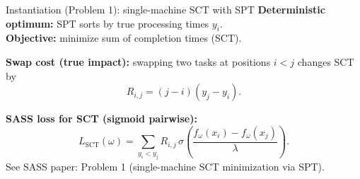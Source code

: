 \documentclass[aspectratio=169,10pt]{beamer}
\newif\iflong
\newcommand{\btext}[1]{\textbf{\color{darkred}#1}}
\newcommand{\smallref}[1]{{\scriptsize\color{darkgray}#1}}
\begin{document}
\begin{frame}{Instantiation (Problem 1): single-machine SCT with SPT}
  \btext{Deterministic optimum:} SPT sorts by true processing times \(y_i\).\\
  \btext{Objective:} minimize sum of completion times (SCT).

  \vspace{0.15cm}
  \btext{Swap cost (true impact):}
  swapping two tasks at positions \(i<j\) changes SCT by
  \[
    R_{i,j} = (j-i)(y_j-y_i).
  \]

  \vspace{0.1cm}
  \btext{SASS loss for SCT (sigmoid pairwise):}
  \[
    L_{\mathrm{SCT}}(\omega)=
    \sum_{y_i<y_j}
      R_{i,j}\,
      \sigma\!\left(\frac{f_\omega(x_i)-f_\omega(x_j)}{\lambda}\right).
  \]
  \smallref{See SASS paper: Problem 1 (single-machine SCT minimization via SPT).}
\end{frame}

\iflong
\begin{frame}{Instantiation (Problem 2): flow shop makespan via Johnson’s rule}
  \btext{Setting:} two-machine flow shop \(F2\|C_{\max}\) with unknown processing times \((p_{i1},p_{i2})\).

  \vspace{0.15cm}
  \begin{block}{Johnson’s rule = two layers of critical decisions}
    Partition:
    \[
      G_1=\{i:p_{i1}<p_{i2}\},\quad G_2=\{i:p_{i1}\ge p_{i2}\}.
    \]
    Then sort \(G_1\) by increasing \(p_{i1}\), and \(G_2\) by decreasing \(p_{i2}\).
  \end{block}

  \begin{block}{SASS surrogate decomposes accordingly}
    Predict decision-relevant scores \((\hat d_i,\hat s_i)=f_\omega(x_i)\).
    \begin{itemize}
      \item \btext{Group loss} (assignment): \(L_{\mathrm{group}}=\sum_i |d_i|\,\sigma(-\hat d_i d_i/\lambda)\), where \(d_i=p_{i1}-p_{i2}\).
      \item \btext{Order loss} (within-group): weight each potentially wrong swap by \(\Delta_{i,j}=T_{j,i}-T_{i,j}\) (makespan impact).
    \end{itemize}
    Total: \(L_{\mathrm{Johnson}}=L_{\mathrm{group}}+L_{\mathrm{order}}\).
  \end{block}

  \smallref{Matches SASS draft: group vs ordering losses with weights \(|d_i|\) and \(\Delta_{i,j}\) (``Problem 2: Flow Shop Scheduling'').}
\end{frame}
\fi
\end{document}
